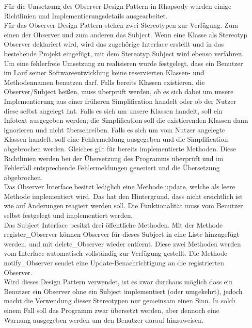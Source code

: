 Für die Umsetzung des Observer Design Pattern in Rhapsody wurden einige Richtlinien und 
Implementierungsdetails ausgearbeitet.\\
\newline
Für das Observer Design Pattern stehen zwei Stereotypen zur Verfügung. Zum einen der Observer 
und zum anderen das Subject. Wenn eine Klasse als Stereotyp Observer deklariert wird, wird das 
zugehörige Interface erstellt und in das bestehende Projekt eingefügt, mit dem Stereotyp Subject 
wird ebenso verfahren.\\
\newline
Um eine fehlerfreie Umsetzung zu realisieren wurde festgelegt, dass ein Benutzer im Lauf seiner 
Softwareentwicklung keine reservierten Klassen- und Methodennamen benutzen darf. Falls bereits Klassen existieren, die Observer/Subject heißen, muss überprüft werden, ob es sich dabei um unsere Implementierung aus einer früheren Simplification handelt oder ob der Nutzer diese selbst angelegt hat. Falls es sich um unsere Klassen handelt, soll ein Infotext ausgegeben werden; die Simplification soll die existierenden Klassen dann ignorieren und nicht überschreiben. Falls es sich um vom Nutzer angelegte Klassen handelt, soll eine Fehlermeldung ausgegeben und die Simplification abgebrochen werden.
Gleiches gilt für bereits implementierte Methoden. 
Diese Richtlinien werden bei der Übersetzung des Programms überprüft und im Fehlerfall 
entsprechende Fehlermeldungen generiert und die Übersetzung abgebrochen.\\
\newline
Das Observer Interface besitzt lediglich eine Methode update, welche als leere Methode 
implementiert wird. Das hat den Hintergrund, dass nicht ersichtlich ist wie auf Änderungen 
reagiert werden soll. Die Funktionalität muss vom Benutzer selbst festgelegt und implementiert 
werden.\\
\newline
Das Subject Interface besitzt drei öffentliche Methoden. Mit der Methode
\\ register_Observer können Observer für dieses Subject in eine Liste
hinzugefügt werden, und mit delete_Observer wieder entfernt. Diese zwei Methoden werden vom Interface automatisch vollständig zur Verfügung gestellt. Die Methode notify_Observer sendet eine Update-Benachrichtigung an die registrierten Observer.\\
\newline
Wird dieses Design Pattern verwendet, ist es zwar durchaus möglich dass ein Benutzer ein 
Observer ohne ein Subject implementiert (oder umgekehrt), jedoch macht die Verwendung 
dieser Stereotypen nur gemeinsam einen Sinn. In solch einem Fall soll das Programm zwar 
übersetzt werden, aber dennoch eine Warnung ausgegeben werden um den Benutzer darauf hinzuweisen.

						
